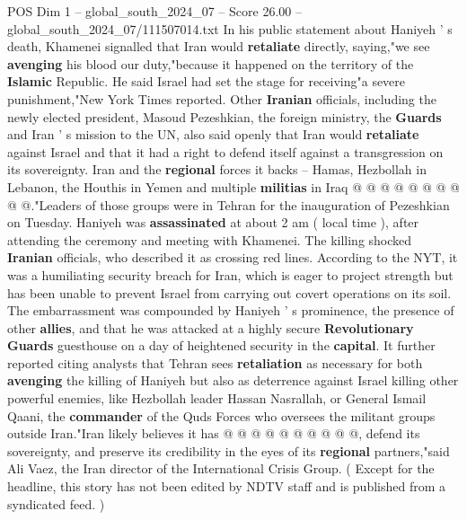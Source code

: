 \begin{textsample}{POS Dim 1 – global\_south\_2024\_07 – Score 26.00 – global\_south\_2024\_07/111507014.txt}
In his public statement about Haniyeh ' s death, Khamenei signalled that Iran would \textbf{retaliate} directly, saying,"we see \textbf{avenging} his blood our duty,"because it happened on the territory of the \textbf{Islamic} Republic.
He said Israel had set the stage for receiving"a severe punishment,"New York Times reported.
Other \textbf{Iranian} officials, including the newly elected president, Masoud Pezeshkian, the foreign ministry, the \textbf{Guards} and Iran ' s mission to the UN, also said openly that Iran would \textbf{retaliate} against Israel and that it had a right to defend itself against a transgression on its sovereignty.
Iran and the \textbf{regional} forces it backs -- Hamas, Hezbollah in Lebanon, the Houthis in Yemen and multiple \textbf{militias} in Iraq @ @ @ @ @ @ @ @ @ @."Leaders of those groups were in Tehran for the inauguration of Pezeshkian on Tuesday.
Haniyeh was \textbf{assassinated} at about 2 am ( local time ), after attending the ceremony and meeting with Khamenei.
The killing shocked \textbf{Iranian} officials, who described it as crossing red lines.
According to the NYT, it was a humiliating security breach for Iran, which is eager to project strength but has been unable to prevent Israel from carrying out covert operations on its soil.
The embarrassment was compounded by Haniyeh ' s prominence, the presence of other \textbf{allies}, and that he was attacked at a highly secure \textbf{Revolutionary} \textbf{Guards} guesthouse on a day of heightened security in the \textbf{capital}.
It further reported citing analysts that Tehran sees \textbf{retaliation} as necessary for both \textbf{avenging} the killing of Haniyeh but also as deterrence against Israel killing other powerful enemies, like Hezbollah leader Hassan Nasrallah, or General Ismail Qaani, the \textbf{commander} of the Quds Forces who oversees the militant groups outside Iran."Iran likely believes it has @ @ @ @ @ @ @ @ @ @, defend its sovereignty, and preserve its credibility in the eyes of its \textbf{regional} partners,"said Ali Vaez, the Iran director of the International Crisis Group. ( Except for the headline, this story has not been edited by NDTV staff and is published from a syndicated feed. )

\end{textsample}
